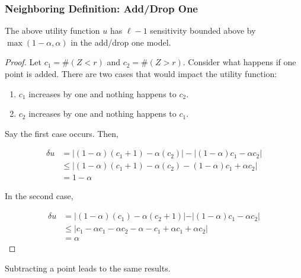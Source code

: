 \documentclass[11pt]{scrartcl} %
\begin{document}
\subsubsection{Neighboring Definition: Add/Drop One}

\begin{lemma}
The above utility function $u$ has $\ell-1$ sensitivity bounded above by $\max(1-\alpha, \alpha)$ in the add/drop one model.
\end{lemma}

\begin{proof}
Let $c_1 = \#(Z<r)$ and $c_2 = \#(Z>r)$.  Consider what happens if one point is added. There are two cases that would impact the utility function: 
\begin{enumerate}
\item $c_1$ increases by one and nothing happens to $c_2$.
\item $c_2$ increases by one and nothing happens to $c_1$.
\end{enumerate}

Say the first case occurs. Then,

\begin{align*}
\delta u &= | (1-\alpha) (c_1 + 1) - \alpha (c_2) | - | (1-\alpha) c_1 - \alpha c_2 |  \\
 	&\le | (1-\alpha) (c_1 + 1) - \alpha (c_2) - (1-\alpha) c_1 + \alpha c_2 | \\
	&= 1 - \alpha
\end{align*}

In the second case,

\begin{align*}
\delta u &= \vert (1-\alpha) (c_1) - \alpha (c_2 + 1) \vert - \vert (1-\alpha) c_1 - \alpha c_2 \vert \\
	&\le \vert c_1 -\alpha c_1 - \alpha c_2 - \alpha - c_1 + \alpha c_1 + \alpha c_2  \vert\\
	&= \alpha 
\end{align*}
\end{proof}

Subtracting a point leads to the same results. 


\nocite{*}

\end{document}
